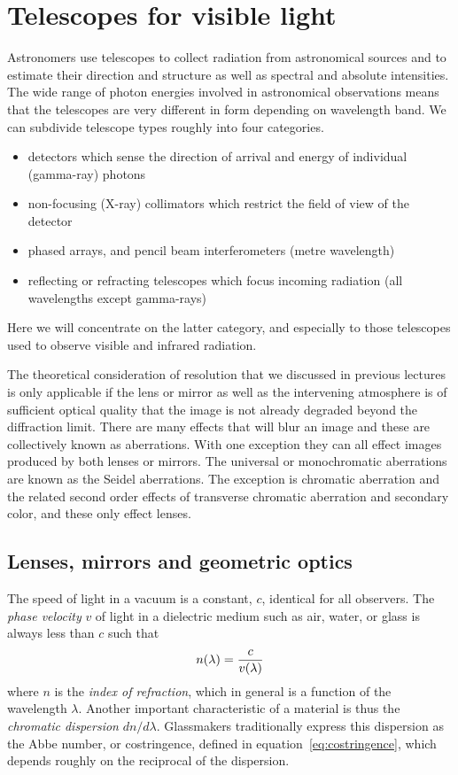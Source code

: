 \chapter{Telescopes for visible light}

Astronomers use telescopes to collect radiation from astronomical sources and
to estimate their direction and structure as well as spectral and absolute 
intensities. The wide range of photon energies involved in astronomical 
observations means that the telescopes are very different in form depending
on wavelength band. We can subdivide telescope types roughly into four 
categories. 
\begin{itemize}
\item detectors which sense the direction of arrival and energy of individual
(gamma-ray) photons
\item non-focusing (X-ray) collimators which restrict the field of view of 
the detector
\item phased arrays, and pencil beam interferometers (metre wavelength)
\item reflecting or refracting telescopes which focus incoming radiation 
(all wavelengths except gamma-rays)
\end{itemize}
Here we will concentrate on the latter category, and especially to those 
telescopes used to observe visible and infrared radiation. 
 
The theoretical
consideration of resolution that we discussed in previous lectures is only 
applicable if the lens or mirror as well as the intervening atmosphere
 is of sufficient optical quality that the image is not already degraded 
beyond the diffraction limit. There are many effects that will blur an image
and these are collectively known as aberrations. With one exception they 
can all effect images produced by both lenses or mirrors. The universal
or monochromatic aberrations are known as the Seidel aberrations. The 
exception is chromatic aberration and the related second order effects of 
transverse chromatic aberration and secondary color, and these only effect
lenses.

\section{Lenses, mirrors and geometric optics}

The speed of light in a vacuum is a constant, $c$, identical for all observers. 
The {\it phase velocity} $v$ of light in a dielectric medium such as air, water, or glass
is always less than $c$ such that
\[
n(\lambda)={c\over v(\lambda)}
\]
where $n$ is the {\it index of refraction}, which in general is a function of the 
wavelength $\lambda$. Another important characteristic of a material is thus the 
{\it chromatic dispersion} $dn/d\lambda$. Glassmakers traditionally express this
dispersion as the Abbe number, or costringence, defined in equation~\ref{eq:costringence}, 
which depends roughly on the reciprocal of the dispersion.


